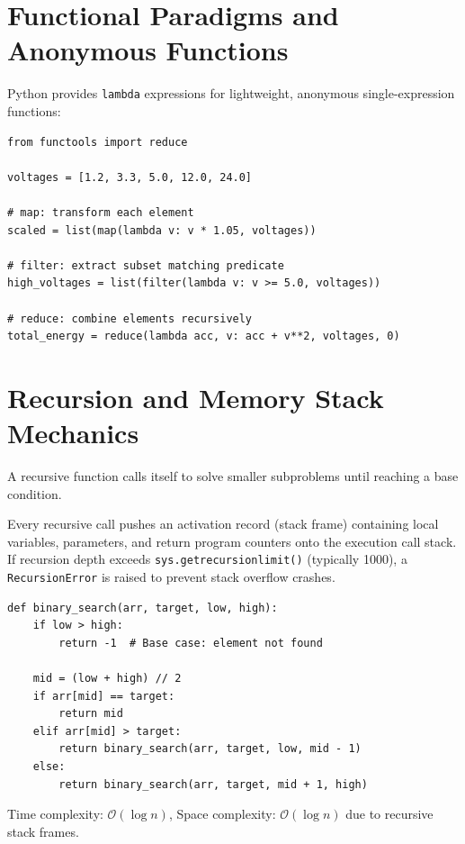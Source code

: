 \section{Functional Paradigms and Anonymous Functions}
Python provides \texttt{lambda} expressions for lightweight, anonymous single-expression functions:
\begin{lstlisting}[caption={Higher-Order Functional Tools}]
from functools import reduce

voltages = [1.2, 3.3, 5.0, 12.0, 24.0]

# map: transform each element
scaled = list(map(lambda v: v * 1.05, voltages))

# filter: extract subset matching predicate
high_voltages = list(filter(lambda v: v >= 5.0, voltages))

# reduce: combine elements recursively
total_energy = reduce(lambda acc, v: acc + v**2, voltages, 0)
\end{lstlisting}

\section{Recursion and Memory Stack Mechanics}

A recursive function calls itself to solve smaller subproblems until reaching a base condition.

\begin{definition}
Every recursive call pushes an activation record (stack frame) containing local variables, parameters, and return program counters onto the execution call stack. If recursion depth exceeds \texttt{sys.getrecursionlimit()} (typically 1000), a \texttt{RecursionError} is raised to prevent stack overflow crashes.
\end{definition}

\begin{examplebox}
\begin{lstlisting}
def binary_search(arr, target, low, high):
    if low > high:
        return -1  # Base case: element not found
    
    mid = (low + high) // 2
    if arr[mid] == target:
        return mid
    elif arr[mid] > target:
        return binary_search(arr, target, low, mid - 1)
    else:
        return binary_search(arr, target, mid + 1, high)
\end{lstlisting}
Time complexity: $\mathcal{O}(\log n)$, Space complexity: $\mathcal{O}(\log n)$ due to recursive stack frames.
\end{examplebox}

